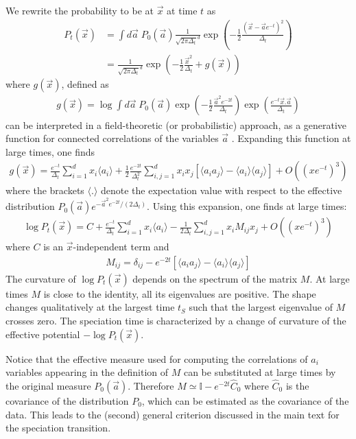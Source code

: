 \documentclass[10pt,twocolumn]{article}
\newcommand{\vx}{\vec x}
\newcommand{\va}{\vec a}
\begin{document}
We rewrite the probability to be at $\vx$ at time $t$ as
\begin{align}
P_t(\vx)&=\int d\va \; P_0(\va) \frac{1}{\sqrt{2\pi
  \Delta_t}^d}\exp\left(-\frac{1}{2} \frac{(\vx-\va
  e^{-t})^2}{\Delta_t}\right)\nonumber\\
  &= \frac{1}{\sqrt{2\pi
  \Delta_t}^d} \exp\left(-\frac{1}{2} \frac{\vx^2}{\Delta_t}+g(\vx) \right) 
\end{align}
where $g(\vx)$, defined as 
\begin{align}
g(\vx)=\log \int d\va \; P_0(\va) \exp\left(-\frac{1}{2} \frac{\va
  ^2 e^{-2t}}{\Delta_t}\right)\exp\left(\frac{e^{-t}\vx.\va}{\Delta_t}\right)
\end{align}
can be interpreted in a field-theoretic (or probabilistic) approach, as a generative function for connected correlations of the variables $\va$ \cite{zinn2021quantum}. Expanding this function at large times, one finds 
\begin{align}
g(\vx)= \frac{e^{-t}}{\Delta_t} \sum_{i=1}^d x_i\langle a_i\rangle+\frac{1}{2}\frac{e^{-2t}}{\Delta_t^2}\sum_{i,j=1}^d
x_ix_j[\langle a_i a_j\rangle-\langle a_i\rangle \langle a_j\rangle] +O\left((x e^{-t})^3\right)
\end{align}
where the brackets $\langle.\rangle$ denote the expectation value with respect to the effective distribution 
$ P_0(\va) e^{-\va^2 e^{-2t}/(2\Delta_t) } $. Using this expansion, one finds  at large times:
\begin{align}
\log P_t(\vx)= C+ \frac{e^{-t}}{\Delta_t} \sum_{i=1}^d x_i\langle a_i\rangle - 
\frac{1}{2\Delta_t} \sum_{i,j=1}^d
x_i M_{ij} x_j+O\left((x e^{-t})^3\right)
\end{align}
where $C$ is an $\vx$-independent term and
\begin{align}
M_{ij}= \delta_{ij}- e^{-2t} [\langle a_i a_j\rangle-\langle a_i\rangle \langle a_j\rangle] 
\end{align}
The curvature of $\log P_t(\vx) $ depends on the spectrum of the matrix $M$. At large times $M$ is close to the identity, all its eigenvalues are positive. The  shape changes qualitatively at the largest time $t_S$ such that the largest eigenvalue of $M$ crosses zero. The speciation time is characterized by a change of curvature of the effective potential  $-\log P_t(\vx)$.

Notice that the effective measure used for computing the correlations of $a_i$ variables appearing in the definition of $M$
can be substituted at large times by the original measure $P_0(\va)$. Therefore $M\simeq \mathbb{I}-e^{-2t} \hat C_0$ where $\hat C_0$ is the covariance of the distribution $P_0$, which can be estimated as the covariance of the data. This leads to the (second) general criterion discussed in the main text for the speciation transition.  
\end{document}
